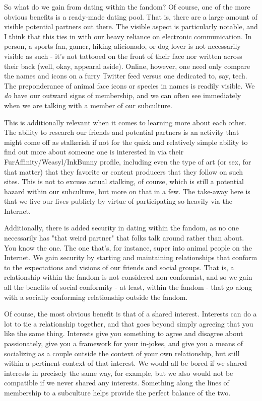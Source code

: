 So what do we gain from dating within the fandom? Of course, one of the more obvious benefits is a ready-made dating pool. That is, there are a large amount of visible potential partners out there. The visible aspect is particularly notable, and I think that this ties in with our heavy reliance on electronic communication. In person, a sports fan, gamer, hiking aficionado, or dog lover is not necessarily visible as such - it's not tattooed on the front of their face nor written across their back (well, okay, appearal aside). Online, however, one need only compare the names and icons on a furry Twitter feed versus one dedicated to, say, tech. The preponderance of animal face icons or species in names is readily visible. We \emph{do} have our outward signs of membership, and we can often see immediately when we are talking with a member of our subculture.

This is additionally relevant when it comes to learning more about each other. The ability to research our friends and potential partners is an activity that might come off as stalkerish if not for the quick and relatively simple ability to find out more about someone one is interested in via their FurAffinity/Weasyl/InkBunny profile, including even the type of art (or sex, for that matter) that they favorite or content producers that they follow on such sites. This is not to excuse actual stalking, of course, which is still a potential hazard within our subculture, but more on that in a few. The take-away here is that we live our lives publicly by virtue of participating so heavily via the Internet.

Additionally, there is added security in dating within the fandom, as no one necessarily has "that weird partner" that folks talk around rather than about. You know the one. The one that's, for instance, super into animal people on the Internet. We gain security by starting and maintaining relationships that conform to the expectations and visions of our friends and social groups. That is, a relationship within the fandom is not considered non-conformist, and so we gain all the benefits of social conformity - at least, within the fandom - that go along with a socially conforming relationship outside the fandom.

Of course, the most obvious benefit is that of a shared interest. Interests can do a lot to tie a relationship together, and that goes beyond simply agreeing that you like the same thing. Interests give you something to agree and disagree about passionately, give you a framework for your in-jokes, and give you a means of socializing as a couple outside the context of your own relationship, but still within a pertinent context of that interest. We would all be bored if we shared interests in precisely the same way, for example, but we also would not be compatible if we never shared any interests. Something along the lines of membership to a subculture helps provide the perfect balance of the two.

